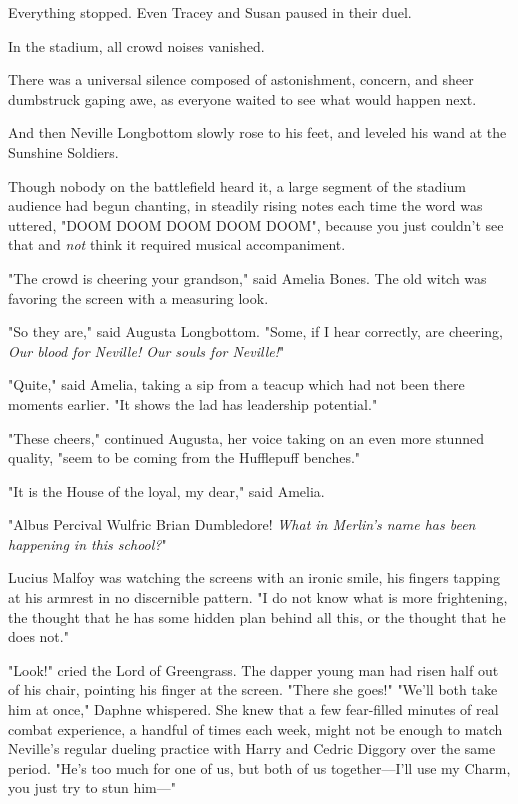 Everything stopped. Even Tracey and Susan paused in their duel.

In the stadium, all crowd noises vanished.

There was a universal silence composed of astonishment, concern, and sheer 
dumbstruck gaping awe, as everyone waited to see what would happen next.

And then Neville Longbottom slowly rose to his feet, and leveled his wand at 
the Sunshine Soldiers.

Though nobody on the battlefield heard it, a large segment of the stadium 
audience had begun chanting, in steadily rising notes each time the word was 
uttered, "DOOM DOOM DOOM DOOM DOOM", because you just couldn't see that and 
\emph{not} think it required musical accompaniment.

"The crowd is cheering your grandson," said Amelia Bones. The old witch was 
favoring the screen with a measuring look.

"So they are," said Augusta Longbottom. "Some, if I hear correctly, are 
cheering, \emph{Our blood for Neville! Our souls for Neville!}"

"Quite," said Amelia, taking a sip from a teacup which had not been there 
moments earlier. "It shows the lad has leadership potential."

"These cheers," continued Augusta, her voice taking on an even more stunned 
quality, "seem to be coming from the Hufflepuff benches."

"It is the House of the loyal, my dear," said Amelia.

"Albus Percival Wulfric Brian Dumbledore! \emph{What in Merlin's name has been 
happening in this school?}"

Lucius Malfoy was watching the screens with an ironic smile, his fingers 
tapping at his armrest in no discernible pattern. "I do not know what is more 
frightening, the thought that he has some hidden plan behind all this, or the 
thought that he does not."

"Look!" cried the Lord of Greengrass. The dapper young man had risen half out 
of his chair, pointing his finger at the screen. "There she goes!"
\sbreak
"We'll both take him at once," Daphne whispered. She knew that a few 
fear-filled minutes of real combat experience, a handful of times each week, 
might not be enough to match Neville's regular dueling practice with Harry and 
Cedric Diggory over the same period. "He's too much for one of us, but both of 
us together---I'll use my Charm, you just try to stun him---"

